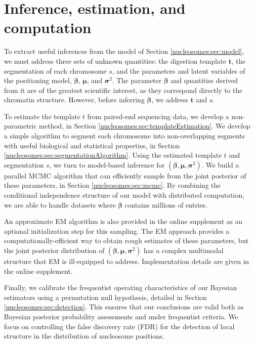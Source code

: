\section{Inference, estimation, and computation}
\label{nucleosomes:sec:estimation}

To extract useful inferences from the model of Section \ref{nucleosomes:sec:model}, we must address three sets of unknown quantities: the digestion template $\bm t$, the segmentation of each chromosome $s$, and the parameters and latent variables of the positioning model, $\bm \beta$, $\bm \mu$, and $\bm \sigma^2$.
The parameter $\bm \beta$ and quantities derived from it are of the greatest scientific interest, as they correspond directly to the chromatin structure.
However, before inferring $\bm \beta$, we address $\bm t$ and $s$.

To estimate the template $t$ from paired-end sequencing data, we develop a non-parametric method, in Section \ref{nucleosomes:sec:templateEstimation}.
We develop a simple algorithm to segment each chromosome into non-overlapping segments with useful biological and statistical properties, in Section \ref{nucleosomes:sec:segmentationAlgorithm}.
%
Using the estimated template $t$ and segmentation $s$, we turn to model-based inference for $(\bm \beta, \bm \mu, \bm \sigma^2)$.
We build a parallel MCMC algorithm that can efficiently sample from the joint posterior of these parameters,  in Section \ref{nucleosomes:sec:mcmc}.
By combining the conditional independence structure of our model with distributed computation, we are able to handle datasets where $\bm \beta$ contains millions of entries.

An approximate EM algorithm is also provided in the online supplement %
as an optional initialization step for this sampling.
The EM approach provides a computationally-efficient way to obtain rough estimates of these parameters, but the joint posterior distribution of $(\bm \beta, \bm \mu, \bm \sigma^2)$ has a complex multimodal structure that EM is ill-equipped to address.
Implementation details are given in the online supplement. %

Finally, we calibrate the frequentist operating characteristics of our Bayesian estimators using a permutation null hypothesis, detailed in Section \ref{nucleosomes:sec:detection}.
This ensures that our conclusions are valid both as Bayesian posterior probability assessments and under frequentist criteria.
We focus on controlling the false discovery rate (FDR) for the detection of local structure in the distribution of nucleosome positions.

